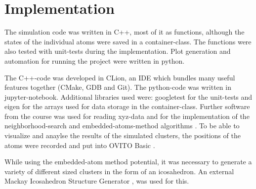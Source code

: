 \chapter{Implementation}
\begin{comment}	
	go about structure of the code 
	-> describe Code structure
		
	-> c++ was used to implement the code (mostly functional)
	-> key atoms container Class which holdes all the Values
	-> most functions were tested with googleTest
\end{comment}

\begin{comment}
code written in c++ most of it pretty functional, classes just used 
for the atoms container which holds the arrays 
while writing it also wrote the unittests with googletest
data aquiered form the code plotted with python
also where large simulations had to be run, called the program from the python code

\end{comment}
The simulation code was written in C++, most of it as functions, although the states of the individual atoms were saved in a container-class.
The functions were also tested with unit-tests during the implementation. 
Plot generation and automation for running the project were written in python.

\begin{comment}
developed in CLion which as an integrated git inviroment
Clion builds with Cmake then clang as a compiler
debugger is gdb(nicely hidden)
- additianal bibs where :
	googletest	for unittests
	eigen		for arrays 
- software used form the class itself 
- ovito for visualization
\end{comment}
The C++-code was developed in CLion, an IDE which bundles many useful features together (CMake, GDB and Git)\cite{clion}.
The python-code was written in jupyter-notebook. 
Additional libraries used were: googletest \cite{googletest} for the unit-tests and eigen \cite{eigen} for the arrays used for data storage in the container-class. 
Further software from the course was used for reading xyz-data and for the implementation of the neighborhood-search and embedded-atoms-method algorithms \cite{molDymCourse}. 
To be able to visualize and anaylse the results of the simulated clusters, the positions of the atoms were recorded and put into OVITO Basic \cite{ovito}.  

While using the embedded-atom method potential, it was necessary to generate a variety of different sized clusters in the form of an icosahedron. An external Mackay Icosahedron Structure Generator \cite{icosader}, was used for this.
\begin{comment}
--
code is structured into the milestones, so an individual milestone can be rerun in case of fuckup
parted into h and cpp files as usual
followed the structure of the milestone
\end{comment}

